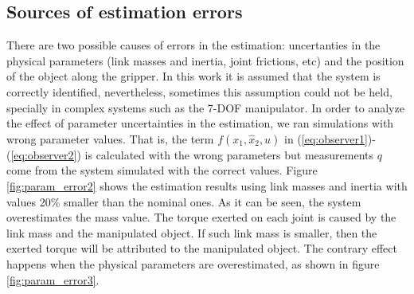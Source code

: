 \documentclass[smallextended]{svjour3}       %
\begin{document}
\subsection{Sources of estimation errors}
There are two possible causes of errors in the estimation: uncertanties in the physical parameters (link masses and inertia, joint frictions, etc) and the position of the object along the gripper. In this work it is assumed that the system is correctly identified, nevertheless, sometimes this assumption could not be held, specially in complex systems such as the 7-DOF manipulator. In order to analyze the effect of parameter uncertainties in the estimation, we ran simulations with wrong parameter values. That is, the term $f(x_1, \hat{x}_2, u)$ in (\ref{eq:observer1})-(\ref{eq:observer2}) is calculated with the wrong parameters but measurements $q$ come from the system simulated with the correct values. Figure \ref{fig:param_error2} shows the estimation results using link masses and inertia with values 20\% smaller than the nominal ones. As it can be seen, the system overestimates the mass value. The torque exerted on each joint is caused by the link mass and the manipulated object. If such link mass is smaller, then the exerted torque will be attributed to the manipulated object. The contrary effect happens when the physical parameters are overestimated, as shown in figure \ref{fig:param_error3}.
\end{document}
